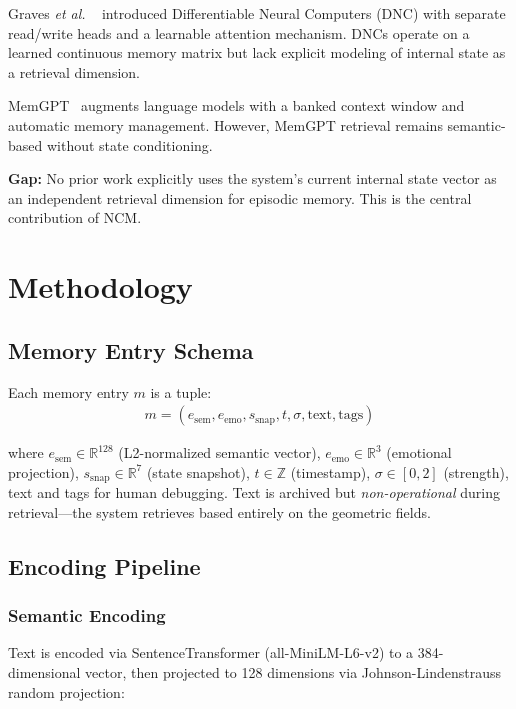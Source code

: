 \documentclass[10pt,twocolumn,letterpaper]{article}
\newcommand{\etal}{{\em et al. }}
\begin{document}
Graves \etal~\cite{Graves2016} introduced Differentiable Neural Computers (DNC) with separate read/write heads and a learnable attention mechanism. DNCs operate on a learned continuous memory matrix but lack explicit modeling of internal state as a retrieval dimension.

MemGPT~\cite{Packer2023} augments language models with a banked context window and automatic memory management. However, MemGPT retrieval remains semantic-based without state conditioning.

\textbf{Gap:} No prior work explicitly uses the system's current internal state vector as an independent retrieval dimension for episodic memory. This is the central contribution of NCM.

\section{Methodology}
\label{sec:method}

\subsection{Memory Entry Schema}

Each memory entry $m$ is a tuple:
\begin{align}
m = (e_{\text{sem}}, e_{\text{emo}}, s_{\text{snap}}, t, \sigma, \text{text}, \text{tags})
\end{align}

where $e_{\text{sem}} \in \mathbb{R}^{128}$ (L2-normalized semantic vector), $e_{\text{emo}} \in \mathbb{R}^{3}$ (emotional projection), $s_{\text{snap}} \in \mathbb{R}^{7}$ (state snapshot), $t \in \mathbb{Z}$ (timestamp), $\sigma \in [0, 2]$ (strength), text and tags for human debugging. Text is archived but \textit{non-operational} during retrieval---the system retrieves based entirely on the geometric fields.

\subsection{Encoding Pipeline}

\subsubsection{Semantic Encoding}

Text is encoded via SentenceTransformer (all-MiniLM-L6-v2) to a 384-dimensional vector, then projected to 128 dimensions via Johnson-Lindenstrauss random projection:
\end{document}
